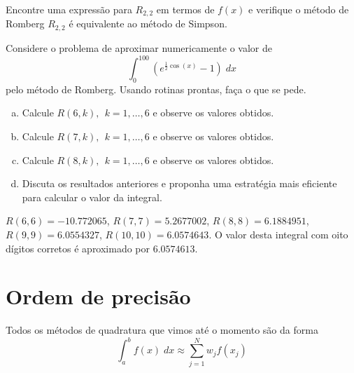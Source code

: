 \begin{exer}
Encontre uma expressão para $R_{2,2}$ em termos de $f(x)$ e verifique o método de Romberg $R_{2,2}$ é equivalente ao método de Simpson.
\end{exer}

\begin{exer}
Considere o problema de aproximar numericamente o valor de
\begin{equation} \int_0^{100} \left(e^{\frac{1}{2}\cos(x)}-1\right)\;dx \end{equation}
pelo método de Romberg. Usando rotinas prontas, faça o que se pede.
\begin{enumerate}[a)]
\item Calcule $R(6,k),~~ k=1,\ldots,6$ e observe os valores obtidos.
\item Calcule $R(7,k),~~ k=1,\ldots,6$ e observe os valores obtidos.
\item Calcule $R(8,k),~~ k=1,\ldots,6$ e observe os valores obtidos.
\item Discuta os resultados anteriores e proponha uma estratégia mais eficiente para calcular o valor da integral.
\end{enumerate}
\end{exer}
\begin{resp}
  $R(6,6)=- 10.772065$, $R(7,7)=5.2677002$, $R(8,8)=6.1884951$, $R(9,9)=6.0554327$, $R(10,10)=6.0574643$. O valor desta integral com oito dígitos corretos é aproximado por  $6.0574613$.
\end{resp}

\section{Ordem de precisão}

Todos os métodos de quadratura que vimos até o momento são da forma
\begin{equation} \int_a^b f(x)\;dx \approx \sum_{j=1}^N w_j f(x_j) \end{equation}

